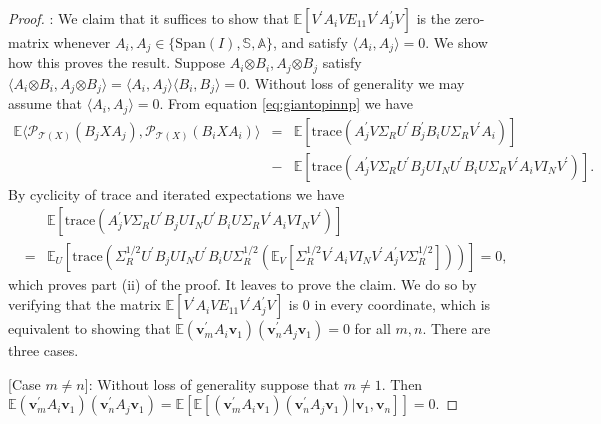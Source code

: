 \documentclass[11pt,letterpaper]{article}
\newcommand{\bv}{\mathbf{v}}
\newcommand{\botimes}{\boldsymbol \otimes}
\newcommand{\ct}{\mathcal{T}}
\newcommand{\cp}{\mathcal{P}}
\begin{document}
\begin{proof}
	\noindent [Part (ii)]: We claim that it suffices to show that $\mathbb{E} [ V^{\prime} A_i V E_{11} V^{\prime} A_j^{\prime} V] $ is the zero-matrix whenever $A_i,A_j \in \{ \mathrm{Span}(I), \mathbb{S}, \mathbb{A} \}$, and satisfy $\langle A_i, A_j \rangle = 0$.  We show how this proves the result.  Suppose $A_i \botimes B_i, A_j \botimes B_j$ satisfy $\langle A_i \botimes B_i , A_j \botimes B_j \rangle = \langle A_i, A_j \rangle \langle B_i, B_j \rangle = 0$.  Without loss of generality we may assume that $\langle A_i, A_j \rangle = 0$.  From equation \eqref{eq:giantopinnp} we have
	\begin{eqnarray*}
		\mathbb{E}  \langle \cp_{\ct(X)} (B_j X A_j), \cp_{\ct(X)}(B_i X A_i) \rangle & = & \mathbb{E} [ \mathrm{trace}( A_j^{\prime} V \Sigma_R U^{\prime} B_j^{\prime} B_i U \Sigma_R V^{\prime} A_i ) ] \\
		& - & \mathbb{E}[ \mathrm{trace} ( A^{\prime}_j V \Sigma_R U^{\prime} B_j U I_N U^{\prime} B_i U \Sigma_R V^{\prime} A_i V I_N V^{\prime} )].
	\end{eqnarray*}
	By cyclicity of trace and iterated expectations we have
	\begin{eqnarray*}
		&& \mathbb{E}[ \mathrm{trace} ( A^{\prime}_j V \Sigma_R U^{\prime} B_j U I_N U^{\prime} B_i U \Sigma_R V^{\prime} A_i V I_N V^{\prime} )] \\
		& =& \mathbb{E}_{U}[ \mathrm{trace} (\Sigma_R^{1/2} U^{\prime} B_j U I_N U^{\prime} B_i U \Sigma_R^{1/2} (\mathbb{E}_{V} [ \Sigma_R^{1/2} V^{\prime} A_i V I_N V^{\prime} A^{\prime}_j V \Sigma_R^{1/2} ]))] = 0,
	\end{eqnarray*}
	which proves part (ii) of the proof.  It leaves to prove the claim.  We do so by verifying that the matrix $\mathbb{E} [ V^{\prime} A_i V E_{11} V^{\prime} A_j^{\prime} V] $ is $0$ in every coordinate, which is equivalent to showing that $\mathbb{E} (\bv^{\prime}_{m} A_i \bv_1) (\bv^{\prime}_{n} A_j \bv_1) =0$ for all $m,n$.  There are three cases.
	
	[Case $m \neq n$]: Without loss of generality suppose that $m \neq 1$.  Then $\mathbb{E} (\bv^{\prime}_{m} A_i \bv_1) (\bv^{\prime}_{n} A_j \bv_1) = \mathbb{E}[\mathbb{E} [ (\bv^{\prime}_{m} A_i \bv_1) (\bv^{\prime}_{n} A_j \bv_1)|\bv_1,\bv_n]] = 0$.
	

\end{proof}
\end{document}
